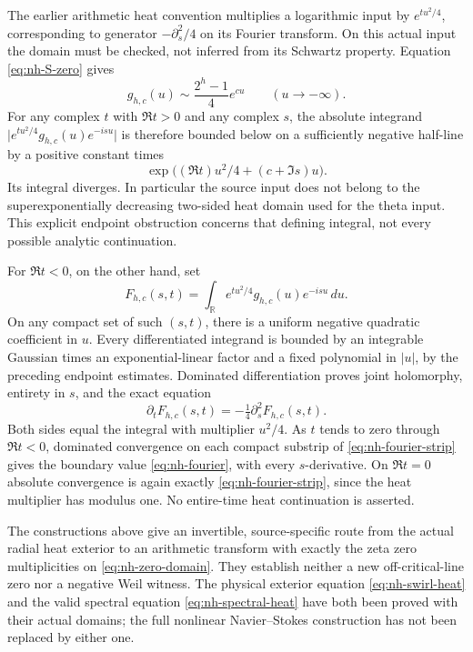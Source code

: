 The earlier arithmetic heat convention multiplies a logarithmic input
by \(e^{tu^2/4}\), corresponding to generator
\(-\partial_s^2/4\) on its Fourier transform. On this actual input
the domain must be checked, not inferred from its Schwartz property.
Equation \eqref{eq:nh-S-zero} gives
\begin{equation}\label{eq:nh-left-asymptotic}
 g_{h,c}(u)\sim \frac{2^h-1}{4}e^{cu}\qquad(u\to-\infty).
\end{equation}
For any complex \(t\) with \(\Re t>0\) and any complex \(s\),
the absolute integrand
\(\lvert e^{tu^2/4}g_{h,c}(u)e^{-isu}\rvert\)
is therefore bounded below on a sufficiently negative half-line by
a positive constant times
\[
 \exp\bigl((\Re t)u^2/4+(c+\Im s)u\bigr).
\]
Its integral diverges. In particular the source input does not belong
to the superexponentially decreasing two-sided heat domain used for
the theta input. This explicit endpoint obstruction concerns that
defining integral, not every possible analytic continuation.

For \(\Re t<0\), on the other hand, set
\begin{equation}\label{eq:nh-negative-heat}
 F_{h,c}(s,t)=\int_{\mathbb R}
 e^{tu^2/4}g_{h,c}(u)e^{-isu}\,du .
\end{equation}
On any compact set of such \((s,t)\), there is a uniform negative
quadratic coefficient in \(u\). Every differentiated integrand is
bounded by an integrable Gaussian times an exponential-linear factor
and a fixed polynomial in \(|u|\), by the preceding endpoint estimates.
Dominated differentiation proves joint holomorphy, entirety in \(s\),
and the exact equation
\begin{equation}\label{eq:nh-spectral-heat}
 \partial_tF_{h,c}(s,t)=-\tfrac14\partial_s^2F_{h,c}(s,t).
\end{equation}
Both sides equal the integral with multiplier \(u^2/4\).
As \(t\) tends to zero through \(\Re t<0\), dominated convergence
on each compact substrip of \eqref{eq:nh-fourier-strip} gives the
boundary value \eqref{eq:nh-fourier}, with every \(s\)-derivative.
On \(\Re t=0\) absolute convergence is again exactly
\eqref{eq:nh-fourier-strip}, since the heat multiplier has modulus one.
No entire-time heat continuation is asserted.

The constructions above give an invertible, source-specific route from the
actual radial heat exterior to an arithmetic transform with exactly the
zeta zero multiplicities on \eqref{eq:nh-zero-domain}. They establish
neither a new off-critical-line zero nor a negative Weil witness. The
physical exterior equation \eqref{eq:nh-swirl-heat} and the valid
spectral equation \eqref{eq:nh-spectral-heat} have both been proved with
their actual domains; the full nonlinear Navier--Stokes construction
has not been replaced by either one.
